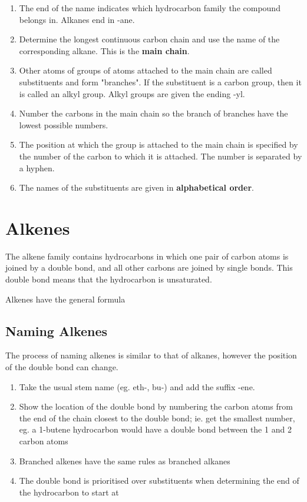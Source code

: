 		\begin{enumerate}
			\item The end of the name indicates which hydrocarbon family the compound belongs in. Alkanes end in -ane.
			\item Determine the longest continuous carbon chain and use the name of the corresponding alkane. This is the \textbf{main chain}.
			\item Other atoms of groups of atoms attached to the main chain are called substituents and form "branches". If the substituent is a carbon group, then it is called an alkyl group. Alkyl groups are given the ending -yl.
			\item Number the carbons in the main chain so the branch of branches have the lowest possible numbers.
			\item The position at which the group is attached to the main chain is specified by the number of the carbon to which it is attached. The number is separated by a hyphen.
			\item The names of the substituents are given in \textbf{alphabetical order}.
		\end{enumerate}

\section{Alkenes} \label{07/05/2025}
	
	The alkene family contains hydrocarbons in which one pair of carbon atoms is joined by a double bond, and all other carbons are joined by single bonds. This double bond means that the hydrocarbon is unsaturated.

	Alkenes have the general formula 

	\subsection{Naming Alkenes}

		The process of naming alkenes is similar to that of alkanes, however the position of the double bond can change.

		\begin{enumerate}
			\item Take the usual stem name (eg. eth-, bu-) and add the suffix -ene.
			\item Show the location of the double bond by numbering the carbon atoms from the end of the chain closest to the double bond; ie. get the smallest number, eg. a 1-butene hydrocarbon would have a double bond between the 1 and 2 carbon atoms
			\item Branched alkenes have the same rules as branched alkanes
			\item The double bond is prioritised over substituents when determining the end of the hydrocarbon to start at
		\end{enumerate}

